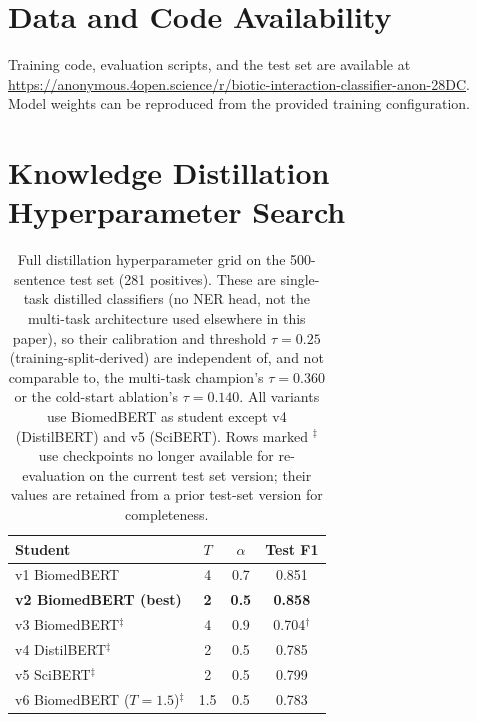\documentclass[11pt]{article}
\begin{document}
\section*{Data and Code Availability}

Training code, evaluation scripts, and the test set are available at
\url{https://anonymous.4open.science/r/biotic-interaction-classifier-anon-28DC}.
Model weights can be reproduced from the provided training configuration.



\clearpage
\onecolumn
\appendix

\section{Knowledge Distillation Hyperparameter Search}
\label{app:distillation}

\begin{table}[H]
\centering
\caption{Full distillation hyperparameter grid on the 500-sentence test set
(281 positives). These are single-task distilled classifiers (no NER head,
not the multi-task architecture used elsewhere in this paper), so their
calibration and threshold $\tau{=}0.25$ (training-split-derived) are independent
of, and not comparable to, the multi-task champion's $\tau{=}0.360$ or the
cold-start ablation's $\tau{=}0.140$.
All variants use BiomedBERT as student except v4 (DistilBERT)
and v5 (SciBERT). Rows marked $^{\ddagger}$ use checkpoints no longer
available for re-evaluation on the current test set version; their values
are retained from a prior test-set version for completeness.}
\label{tab:distillation_full}
\begin{tabular}{lccc}
\toprule
\textbf{Student} & $T$ & $\alpha$ & \textbf{Test F1} \\
\midrule
v1 BiomedBERT & 4 & 0.7 & 0.851 \\
\rowcolor{bestrow}
\textbf{v2 BiomedBERT (best)} & \textbf{2} & \textbf{0.5} & \textbf{0.858} \\
v3 BiomedBERT$^{\ddagger}$ & 4 & 0.9 & 0.704$^{\dagger}$ \\
v4 DistilBERT$^{\ddagger}$ & 2 & 0.5 & 0.785 \\
v5 SciBERT$^{\ddagger}$    & 2 & 0.5 & 0.799 \\
v6 BiomedBERT ($T{=}1.5$)$^{\ddagger}$ & 1.5 & 0.5 & 0.783 \\
\bottomrule
\end{tabular}

\smallskip{}
\end{table}
\end{document}
